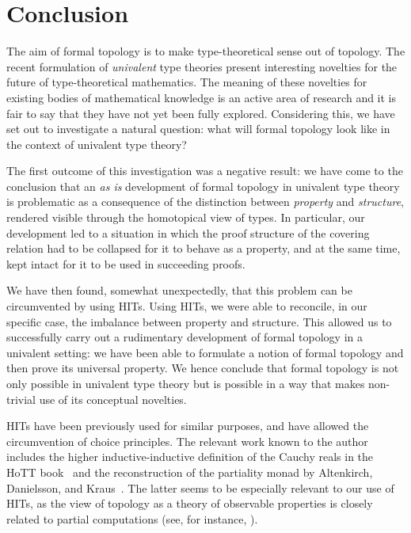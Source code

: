 \chapter{Conclusion}\label{chap:conc}

The aim of formal topology is to make type-theoretical sense out of topology. The recent
formulation of \emph{univalent} type theories present interesting novelties for the future
of type-theoretical mathematics. The meaning of these novelties for existing bodies of
mathematical knowledge is an active area of research and it is fair to say that they have
not yet been fully explored. Considering this, we have set out to investigate a
natural question: what will formal topology look like in the context of univalent type
theory?

The first outcome of this investigation was a negative result: we have come to the
conclusion that an \emph{as is} development of formal topology in univalent type theory is
problematic as a consequence of the distinction between \emph{property} and
\emph{structure}, rendered visible through the homotopical view of types. In particular,
our development led to a situation in which the proof structure of the covering relation
had to be collapsed for it to behave as a property, and at the same time, kept intact for
it to be used in succeeding proofs.

We have then found, somewhat unexpectedly, that this problem can be circumvented by using
HITs. Using HITs, we were able to reconcile, in our specific case, the imbalance between
property and structure. This allowed us to successfully carry out a rudimentary
development of formal topology in a univalent setting: we have been able to formulate a
notion of formal topology and then prove its universal property. We hence conclude that
formal topology is not only possible in univalent type theory but is possible in a way
that makes non-trivial use of its conceptual novelties.

HITs have been previously used for similar purposes, and have allowed the circumvention of
choice principles. The relevant work known to the author includes the higher
inductive-inductive definition of the Cauchy reals in the HoTT
book~\cite[Defn.~11.3.2]{hottbook} and the reconstruction of the partiality monad by
Altenkirch, Danielsson, and Kraus~\cite{partiality-revisited}. The latter seems to be
especially relevant to our use of HITs, as the view of topology as a theory of observable
properties is closely related to partial computations (see, for instance,
\cite{synthetic-topology, shulman-logic-of-space}).

